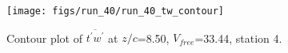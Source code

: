 \begin{figure}[H]
\centering
\texttt{[image: figs/run\_40/run\_40\_tw\_contour]}
\caption{Contour plot of $\overline{t^\prime w^\prime}$ at $z/c$=8.50, $V_{free}$=33.44, station 4.}
\label{fig:run_40_tw_contour}
\end{figure}


